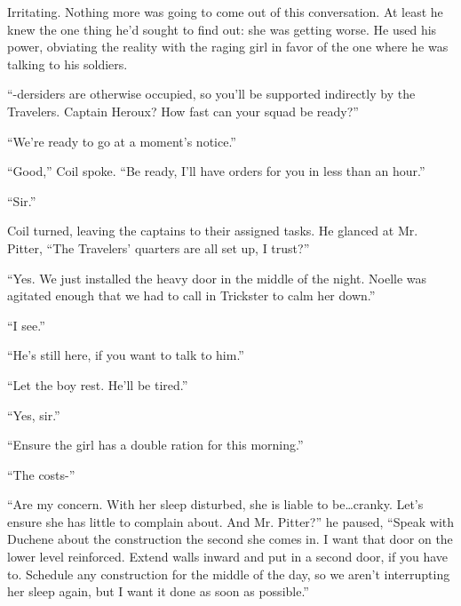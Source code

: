 Irritating.  Nothing more was going to come out of this conversation.   At least he knew the one thing he'd sought to find out: she was getting worse.  He used his power, obviating the reality with the raging girl in favor of the one where he was talking to his soldiers.



``-dersiders are otherwise occupied, so you'll be supported indirectly by the Travelers.  Captain Heroux?  How fast can your squad be ready?''



``We're ready to go at a moment's notice.''



``Good,'' Coil spoke.  ``Be ready, I'll have orders for you in less than an hour.''



``Sir.''



Coil turned, leaving the captains to their assigned tasks.  He glanced at Mr. Pitter, ``The Travelers' quarters are all set up, I trust?''



``Yes.  We just installed the heavy door in the middle of the night.  Noelle was agitated enough that we had to call in Trickster to calm her down.''



``I see.''



``He's still here, if you want to talk to him.''



``Let the boy rest.  He'll be tired.''



``Yes, sir.''



``Ensure the girl has a double ration for this morning.''



``The costs-''



``Are my concern.  With her sleep disturbed, she is liable to be\ldots cranky.  Let's ensure she has little to complain about.  And Mr. Pitter?'' he paused, ``Speak with Duchene about the construction the second she comes in.  I want that door on the lower level reinforced.  Extend walls inward and put in a second door, if you have to.  Schedule any construction for the middle of the day, so we aren't interrupting her sleep again, but I want it done as soon as possible.''



